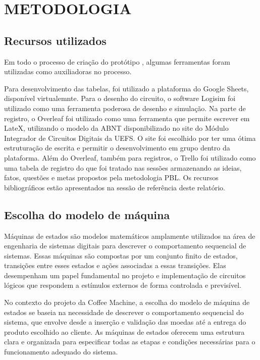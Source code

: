 \chapter{METODOLOGIA}

\section{Recursos utilizados}
Em todo o processo de criação do protótipo , algumas ferramentas foram utilizadas como auxiliadoras no processo.

Para desenvolvimento das tabelas, foi utilizado a plataforma do Google Sheets, disponível virtualemnte. Para o desenho do circuito, o software Logisim foi utilizado como uma ferramenta poderosa de desenho e simulação. Na parte de registro, o Overleaf foi utilizado como uma ferramenta que permite escrever em LateX, utilizando o modelo da ABNT disponibilizado no site do Módulo Integrador de Circuitos Digitais da UEFS. O site foi escolhido por ter uma ótima estruturação de escrita e permitir o desenvolvimento em grupo dentro da plataforma. Além do Overleaf, também para registros, o Trello foi utilizado como uma tabela de registro do que foi tratado nas sessões armazenando as ideias, fatos, questões e metas propostos pela metodologia PBL. Os recursos bibliográficos estão apresentados na sessão de referência deste relatório.

\section{Escolha do modelo de máquina}

Máquinas de estados são modelos matemáticos amplamente utilizados na área de engenharia de sistemas digitais para descrever o comportamento sequencial de sistemas. Essas máquinas são compostas por um conjunto finito de estados, transições entre esses estados e ações associadas a essas transições. Elas desempenham um papel fundamental no projeto e implementação de circuitos lógicos que respondem a estímulos externos de forma controlada e previsível.

No contexto do projeto da Coffee Machine, a escolha do modelo de máquina de estados se baseia na necessidade de descrever o comportamento sequencial do sistema, que envolve desde a inserção e validação das moedas até a entrega do produto escolhido ao cliente. As máquinas de estados oferecem uma estrutura clara e organizada para especificar todas as etapas e condições necessárias para o funcionamento adequado do sistema.

